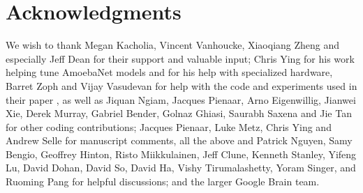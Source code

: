 \documentclass[letterpaper]{article} \usepackage{aaai19}  \usepackage{times}  \usepackage{helvet}  \usepackage{courier}  \usepackage{graphicx}  \frenchspacing
\begin{document}
\section{Acknowledgments}
We wish to thank Megan Kacholia, Vincent Vanhoucke, Xiaoqiang Zheng and especially Jeff Dean for their support and valuable input; Chris Ying for his work helping tune AmoebaNet models and for his help with specialized hardware, Barret Zoph and Vijay Vasudevan for help with the code and experiments used in their paper \cite{zoph2017learning}, as well as Jiquan Ngiam, Jacques Pienaar, Arno Eigenwillig, Jianwei Xie, Derek Murray, Gabriel Bender, Golnaz Ghiasi, Saurabh Saxena and Jie Tan for other coding contributions; Jacques Pienaar, Luke Metz, Chris Ying and Andrew Selle for manuscript comments, all the above and Patrick Nguyen, Samy Bengio, Geoffrey Hinton, Risto Miikkulainen, Jeff Clune, Kenneth Stanley, Yifeng Lu, David Dohan, David So, David Ha, Vishy Tirumalashetty, Yoram Singer, and Ruoming Pang for helpful discussions; and the larger Google Brain team.







\renewcommand{\thesection}{A-\arabic{section}}
\renewcommand{\thefigure}{A-\arabic{figure}}
\setcounter{section}{0}
\setcounter{figure}{0}
\setcounter{table}{0}
\end{document}
